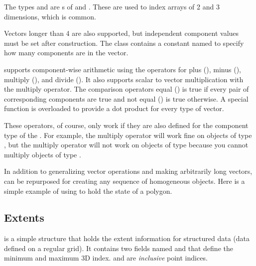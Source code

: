 The types  and  are s of
 and . These
are used to index arrays of 2 and 3 dimensions, which is common.

Vectors longer than 4 are also supported, but independent component values
must be set after construction. The  class contains a constant
named  to specify how many
components are in the vector.


 supports component-wise arithmetic using the operators
for plus (\textcode{+}), minus (\textcode{-}), multiply (\textcode{*}), and
divide (\textcode{/}). It also supports scalar to vector multiplication
with the multiply operator. The comparison operators equal (\textcode{==})
is true if every pair of corresponding components are true and not equal
(\textcode{!=}) is true otherwise. A special  function is
overloaded to provide a dot product for every type of vector.


These operators, of course, only work if they are also defined for the
component type of the . For example, the multiply operator will
work fine on objects of type , but the multiply
operator will not work on objects of type 
because you cannot multiply objects of type .

In addition to generalizing vector operations and making arbitrarily long
vectors,  can be repurposed for creating any sequence of
homogeneous objects. Here is a simple example of using  to hold
the state of a polygon.


\subsection{Extents}

 is a simple structure that holds the extent information for
structured data (data defined on a regular grid). It contains two
 fields named  and  that define the
minimum and maximum 3D index.  and  are
\emph{inclusive} point indices.

